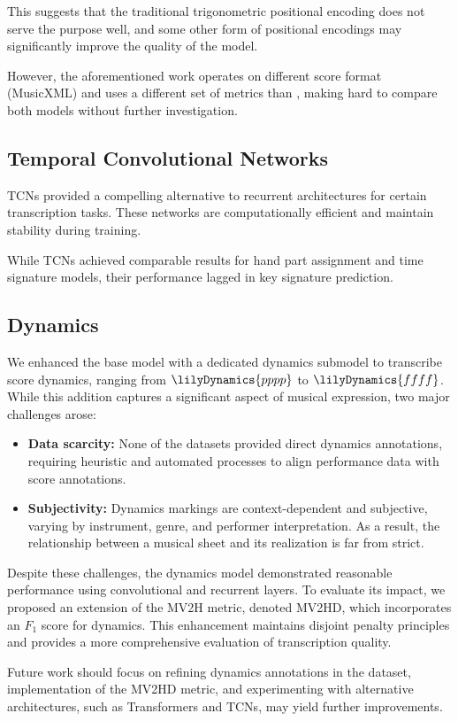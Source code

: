This suggests that the traditional trigonometric positional encoding does not serve the purpose well, and some other form of positional encodings may significantly improve the quality of the model.

However, the aforementioned work operates on different score format (MusicXML) and uses a different set of metrics than \cite{Liu2022}, making hard to compare both models without further investigation.

\subsection{Temporal Convolutional Networks}

TCNs provided a compelling alternative to recurrent architectures for certain transcription tasks. These networks are computationally efficient and maintain stability during training.

While TCNs achieved comparable results for hand part assignment and time signature models, their performance lagged in key signature prediction.

\subsection{Dynamics}

We enhanced the base model with a dedicated dynamics submodel to transcribe score dynamics, ranging from $\lilyDynamics{pppp}$ to $\lilyDynamics{ffff}$. While this addition captures a significant aspect of musical expression, two major challenges arose: 	\begin{itemize}
	\item \textbf{Data scarcity:} None of the datasets provided direct dynamics annotations, requiring heuristic and automated processes to align performance data with score annotations.
	\item \textbf{Subjectivity:} Dynamics markings are context-dependent and subjective, varying by instrument, genre, and performer interpretation. As a result, the relationship between a musical sheet and its realization is far from strict.	\end{itemize}

Despite these challenges, the dynamics model demonstrated reasonable performance using convolutional and recurrent layers. To evaluate its impact, we proposed an extension of the MV2H metric, denoted MV2HD, which incorporates an $F_1$ score for dynamics. This enhancement maintains disjoint penalty principles and provides a more comprehensive evaluation of transcription quality.

Future work should focus on refining dynamics annotations in the dataset, implementation of the MV2HD metric, and experimenting with alternative architectures, such as Transformers and TCNs, may yield further improvements.